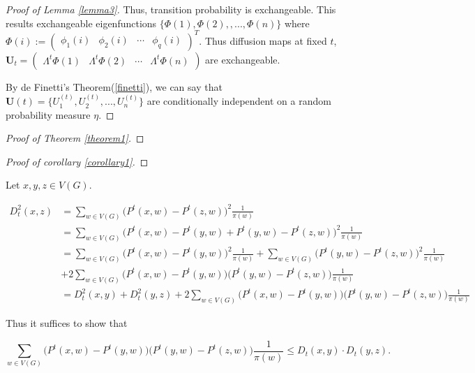 \documentclass[12pt]{article}
\theoremstyle{definition}
\begin{document}
\begin{proof}[Proof of Lemma \ref{lemma3}]
Thus, transition probability is exchangeable. 
This results exchangeable eigenfunctions $\{ \Phi(1), \Phi(2), , ... , \Phi(n) \}$ 
where $\Phi(i) := \begin{pmatrix} \phi_{1}(i) & \phi_{2}(i) & \cdots & \phi_{q}(i) \end{pmatrix}^{T}$. Thus diffusion maps at fixed $t$, $\mathbf{U}_{t} = \begin{pmatrix} \Lambda^{t} \Phi(1)  & \Lambda^{t} \Phi(2) & \cdots & \Lambda^{t} \Phi(n)  \end{pmatrix}$ are exchangeable. 

By de Finetti's Theorem(\ref{finetti}), we can say that $\mathbf{U}(t) = \{ U^{(t)}_{1}, U^{(t)}_{2}, ... , U^{(t)}_{n} \}$ are conditionally independent on a random probability measure $\eta$. 
\end{proof}


\begin{proof}[Proof of Theorem \ref{theorem1}]
\end{proof}


\begin{proof}[Proof of corollary \ref{corollary1}]
\end{proof}

Let $x, y, z \in V(G).$

\begin{equation}
\begin{split}
 D^{2}_{t}(x,z) & = \sum\limits_{w \in V(G)} \big( P^{t}(x,w) - P^{t}(z,w)   \big)^2 \frac{1}{\pi(w)}  \\ & = \sum\limits_{w \in V(G)} \big(P^{t}(x, w) - P^{t}(y,w) + P^{t}(y,w) - P^{t}(z,w) \big)^2 \frac{1}{\pi(w)} \\ & = \sum\limits_{w \in V(G)} \big( P^{t}(x,w) - P^{t}(y,w) \big)^2 \frac{1}{\pi(w)}  + \sum\limits_{w \in V(G)} \big( P^{t}(y,w) - P^{t}(z,w)  \big)^2 \frac{1}{\pi(w)} \\ & + 2 \sum\limits_{w \in V(G)} \big( P^{t}(x,w) - P^{t}(y,w)  \big) \big( P^{t}(y,w) - P^{t}(z,w)  \big)\frac{1}{\pi(w)} \\ &= D^{2}_{t}(x,y) + D^{2}_{t}(y,z) +  2 \sum\limits_{w \in V(G)} \big( P^{t}(x,w) - P^{t}(y,w)  \big) \big( P^{t}(y,w) - P^{t}(z,w)  \big)\frac{1}{\pi(w)}   
\end{split}
\end{equation}


Thus it suffices to show that 

\begin{equation}
\sum\limits_{w \in V(G)} \big( P^{t}(x,w) - P^{t}(y,w)  \big) \big( P^{t}(y,w) - P^{t}(z,w)  \big)\frac{1}{\pi(w)} \leq D_{t}(x,y) \cdot D_{t}(y,z). 
\end{equation}
\end{document}
